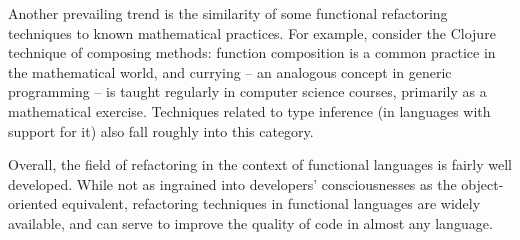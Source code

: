 \documentclass{article}
\begin{document}
Another prevailing trend is the similarity of some functional refactoring techniques to known mathematical practices. For example, consider the Clojure technique of composing methods: function composition is a common practice in the mathematical world, and currying -- an analogous concept in generic programming -- is taught regularly in computer science courses, primarily as a mathematical exercise. Techniques related to type inference (in languages with support for it) also fall roughly into this category.

Overall, the field of refactoring in the context of functional languages is fairly well developed. While not as ingrained into developers' consciousnesses as the object-oriented equivalent, refactoring techniques in functional languages are widely available, and can serve to improve the quality of code in almost any language.



\end{document}
